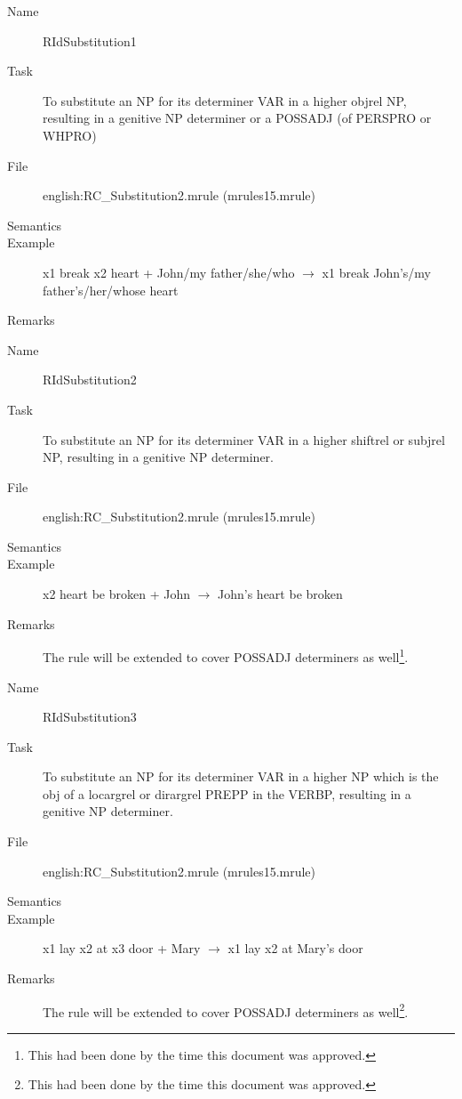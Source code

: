 \begin{description}
\vspace{1 cm}
\begin{description}
\item[Name] RIdSubstitution1
\item[Task] To substitute an NP for its determiner VAR in a higher objrel NP, 
resulting in a genitive NP determiner or a POSSADJ (of PERSPRO or WHPRO)
\item[File] english:RC\_Substitution2.mrule (mrules15.mrule)
\item[Semantics]
\item[Example] x1 break x2 heart + John/my father/she/who $\rightarrow$ x1 
break John's/my father's/her/whose heart
\item[Remarks]
\end{description}

\vspace{1 cm}
\begin{description}
\item[Name] RIdSubstitution2
\item[Task] To substitute an NP for its determiner VAR in a higher shiftrel or 
subjrel NP, resulting in a genitive NP determiner.
\item[File] english:RC\_Substitution2.mrule (mrules15.mrule)
\item[Semantics]
\item[Example] x2 heart be broken + John $\rightarrow$ John's heart be broken
\item[Remarks] The rule will be extended to cover POSSADJ
determiners as well\footnote{This had been done by the time this document was 
approved.}.
\end{description}

\vspace{1 cm}
\begin{description}
\item[Name] RIdSubstitution3
\item[Task] To substitute an NP for its determiner VAR in a higher NP which is 
the obj of a locargrel or dirargrel PREPP in the VERBP, resulting in a genitive 
NP determiner.
\item[File] english:RC\_Substitution2.mrule (mrules15.mrule)
\item[Semantics]
\item[Example] x1 lay x2 at x3 door + Mary $\rightarrow$ x1 lay x2 at Mary's 
door
\item[Remarks] The rule will be extended to cover POSSADJ
determiners as well\footnote{This had been done by the time this document was 
approved.}.
\end{description}


\end{description}
